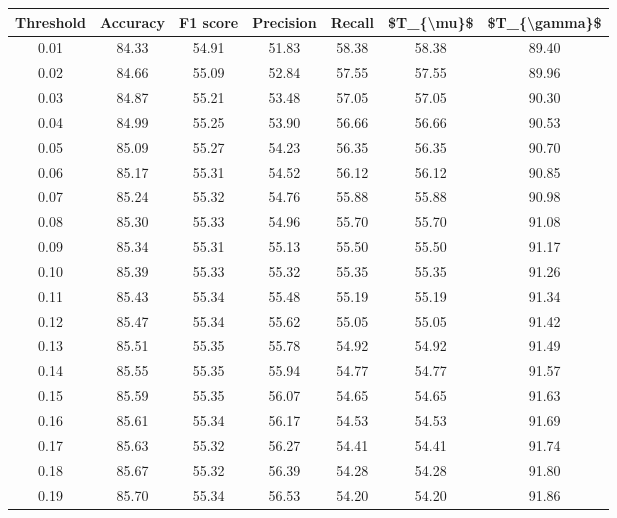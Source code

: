 \begin{tabular}{|c|c|c|c|c|c|c|}
\hline
 Threshold &  Accuracy &  F1 score &  Precision &  Recall &  \$T\_\{\textbackslash mu\}\$ &  \$T\_\{\textbackslash gamma\}\$ \\
\hline
      0.01 &     84.33 &     54.91 &      51.83 &   58.38 &      58.38 &         89.40 \\
      0.02 &     84.66 &     55.09 &      52.84 &   57.55 &      57.55 &         89.96 \\
      0.03 &     84.87 &     55.21 &      53.48 &   57.05 &      57.05 &         90.30 \\
      0.04 &     84.99 &     55.25 &      53.90 &   56.66 &      56.66 &         90.53 \\
      0.05 &     85.09 &     55.27 &      54.23 &   56.35 &      56.35 &         90.70 \\
      0.06 &     85.17 &     55.31 &      54.52 &   56.12 &      56.12 &         90.85 \\
      0.07 &     85.24 &     55.32 &      54.76 &   55.88 &      55.88 &         90.98 \\
      0.08 &     85.30 &     55.33 &      54.96 &   55.70 &      55.70 &         91.08 \\
      0.09 &     85.34 &     55.31 &      55.13 &   55.50 &      55.50 &         91.17 \\
      0.10 &     85.39 &     55.33 &      55.32 &   55.35 &      55.35 &         91.26 \\
      0.11 &     85.43 &     55.34 &      55.48 &   55.19 &      55.19 &         91.34 \\
      0.12 &     85.47 &     55.34 &      55.62 &   55.05 &      55.05 &         91.42 \\
      0.13 &     85.51 &     55.35 &      55.78 &   54.92 &      54.92 &         91.49 \\
      0.14 &     85.55 &     55.35 &      55.94 &   54.77 &      54.77 &         91.57 \\
      0.15 &     85.59 &     55.35 &      56.07 &   54.65 &      54.65 &         91.63 \\
      0.16 &     85.61 &     55.34 &      56.17 &   54.53 &      54.53 &         91.69 \\
      0.17 &     85.63 &     55.32 &      56.27 &   54.41 &      54.41 &         91.74 \\
      0.18 &     85.67 &     55.32 &      56.39 &   54.28 &      54.28 &         91.80 \\
      0.19 &     85.70 &     55.34 &      56.53 &   54.20 &      54.20 &         91.86 \\

\end{tabular}
